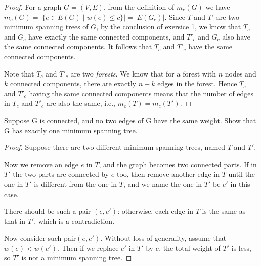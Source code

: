     \begin{proof}
        For a graph $G = (V, E)$, from the definition of $m_c(G)$ we have $m_c(G) = | \{e \in E(G) \mid w(e) \leq c\} | = |E(G_c)|$. Since $T$ and $T'$ are two minimum spanning trees of $G$, by the conclusion of exersice 1, we know that $T_c$ and $G_c$ have exactly the same connected components, and $T'_c$ and $G_c$ also have the same connected components. It follows that $T_c$ and $T'_c$ have the same connected components.
        
        Note that $T_c$ and $T'_c$ are two \textit{forests}. We know that for a forest with $n$ nodes and $k$ connected components, there are exactly $n - k$ edges in the forest. Hence $T_c$ and $T'_c$ having the same connected components means that the number of edges in $T_c$ and $T'_c$ are also the same, i.e., $m_c(T) = m_c(T')$.
    \end{proof}

    \newpage
    
    \begin{thm}{}{}
        Suppose G is connected, and no two edges of G have the same weight. Show that G has exactly one minimum spanning tree.
    \end{thm}

    \begin{proof}[Proof]
        Suppose there are two different minimum spanning trees, named $T$ and $T'$. 
        
        Now we remove an edge $e$ in $T$, and the graph becomes two connected parts. 
        If in $T'$ the two parts are connected by $e$ too, 
        then remove another edge in $T$ until the one in $T'$ is different from the one in $T$, 
        and we name the one in $T'$ be $e'$ in this case. 
        
        There should be such a pair $(e,e')$: 
        otherwise, each edge in $T$ is the same as that in $T'$, which is a contradiction. 
        
        Now consider such pair$(e,e')$. Without loss of generality, assume that $w(e)<w(e')$. 
        Then if we replace $e'$ in $T'$ by $e$, the total weight of $T'$ is less, so $T'$ is not a minimum spanning tree. 
    \end{proof}

    \newpage
    
